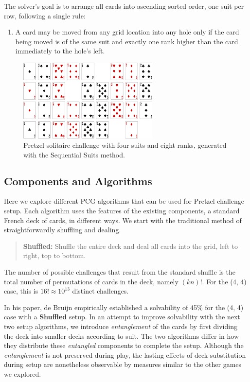 \documentclass[journal]{IEEEtran}
\begin{document}
The solver's goal is to arrange all cards into ascending sorted order, one suit per row, following a single rule:

\begin{enumerate}
    \item A card may be moved from any grid location into any hole only if the card being moved is of the same suit and exactly one rank higher than the card immediately to the hole's left.
\end{enumerate}

%
%
%
%
%
%

\begin{figure}[t]
\centering
\includegraphics[width=7cm]{figure8.png}
\caption{Pretzel solitaire challenge with four suits and eight ranks, generated with the Sequential Suits method.}
\label{fig:pretzelsequential}
\end{figure}



\subsection{Components and Algorithms}
\noindent
Here we explore different PCG algorithms that can be used for Pretzel challenge setup. Each algorithm uses the features of the existing components, a standard French deck of cards, in different ways. We start with the traditional method of straightforwardly shuffling and dealing.

\begin{quote}
    {\bf Shuffled:} Shuffle the entire deck and deal all cards into the grid, left to right, top to bottom.
\end{quote}

%
The number of possible challenges that result from the standard shuffle is the total number of permutations of cards in the deck, namely $(kn)!$. For the (4, 4) case, this is $16! \approx 10^{13}$ distinct challenges.

In his paper, de Bruijn empirically established a solvability of 45\% for the (4, 4) case with a \textbf{Shuffled} setup. In an attempt to improve solvability with the next two setup algorithms, we introduce \textit{entanglement} of the cards by first dividing the deck into smaller decks according to suit. The two algorithms differ in how they distribute these \textit{entangled} components to complete the setup. Although the \textit{entanglement} is not preserved during play, the lasting effects of deck substitution during setup are nonetheless observable by measures similar to the other games we explored.
\end{document}
